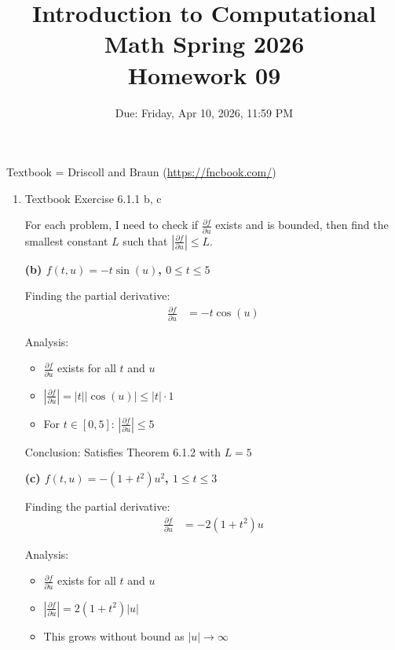 \documentclass[reqno, answers]{exam}
\title{Introduction to Computational Math Spring 2026 \\ Homework 09}
\date{Due: Friday, Apr 10, 2026, 11:59 PM}
\author{}
\begin{document}
\maketitle
\thispagestyle{empty}

Textbook = Driscoll and Braun (\url{https://fncbook.com/})

\begin{enumerate}

  \item Textbook Exercise 6.1.1 b, c

        \begin{solution}
          For each problem, I need to check if $\frac{\partial f}{\partial u}$ exists and is bounded, then find the smallest constant $L$ such that $\left|\frac{\partial f}{\partial u}\right| \leq L$.

          \medskip

          \textbf{(b) $f(t,u) = -t\sin(u)$, $0 \leq t \leq 5$}

          Finding the partial derivative:
          \begin{align*}
            \frac{\partial f}{\partial u} & = -t\cos(u)
          \end{align*}

          Analysis:
          \begin{itemize}
            \item $\frac{\partial f}{\partial u}$ exists for all $t$ and $u$
            \item $\left|\frac{\partial f}{\partial u}\right| = |t||\cos(u)| \leq |t| \cdot 1$
            \item For $t \in [0,5]$: $\left|\frac{\partial f}{\partial u}\right| \leq 5$
          \end{itemize}

          Conclusion: Satisfies Theorem 6.1.2 with $\boxed{L = 5}$

          \medskip

          \textbf{(c) $f(t,u) = -(1+t^2)u^2$, $1 \leq t \leq 3$}

          Finding the partial derivative:
          \begin{align*}
            \frac{\partial f}{\partial u} & = -2(1+t^2)u
          \end{align*}

          Analysis:
          \begin{itemize}
            \item $\frac{\partial f}{\partial u}$ exists for all $t$ and $u$
            \item $\left|\frac{\partial f}{\partial u}\right| = 2(1+t^2)|u|$
            \item This grows without bound as $|u| \to \infty$
          \end{itemize}


\end{solution}
\end{enumerate}
\end{document}
